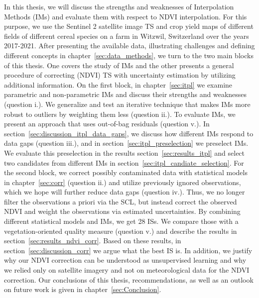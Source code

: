 In this thesis, we will discuss the strengths and weaknesses of Interpolation Methods ({{IM}}s) and evaluate them with respect to NDVI interpolation. For this purpose, we use the Sentinel 2 satellite image {TS} and crop yield maps of different fields of different cereal species on a farm in Witzwil, Switzerland over the years 2017-2021. After presenting the available data, illustrating challenges and defining different concepts in chapter~\ref{sec:data_methods}, we turn to the two main blocks of this thesis. One covers the study of IMs and the other presents a general procedure of correcting (NDVI) TS with uncertainty estimation by utilizing additional information.
On the first block, in chapter~\ref{sec:itpl} we examine parametric and non-parametric {{IM}}s and discuss their strengths and weaknesses (question i.). We generalize and test an iterative technique that makes IMs more robust to outliers by weighting them less (question ii.). To evaluate IMs, we present an approach that uses out-of-bag residuals (question v.). In section~\ref{sec:discussion_itpl_data_gaps}, we discuss how different {{IM}}s respond to data gaps (question iii.), and in section~\ref{sec:itpl_preselection} we preselect {{IM}}s. We evaluate this preselection in the results section~\ref{sec:results_itpl} and select two candidates from different {{IM}}s in section~\ref{sec:itpl_candiate_selection}.
For the second block, we correct possibly contaminated data with statistical models in chapter~\ref{sec:corr} (question ii.) and utilize previously ignored observations, which we hope will further reduce data gaps (question iv.). Thus, we no longer filter the observations a priori via the SCL, but instead correct the observed NDVI and weight the observations via estimated uncertainties. By combining different statistical models and IMs, we get 28 {{ISs}}. We compare those with a vegetation-oriented quality measure (question v.) and describe the results in section~\ref{sec:results_ndvi_corr}. Based on these results, in section~\ref{sec:discussion_corr} we argue what the best {{IS}} is. In addition, we justify why our NDVI correction can be understood as unsupervised learning and why we relied only on satellite imagery and not on meteorological data for the NDVI correction.
Our conclusions of this thesis, recommendations, as well as an outlook on future work is given in chapter~\ref{sec:Conclusion}. 








